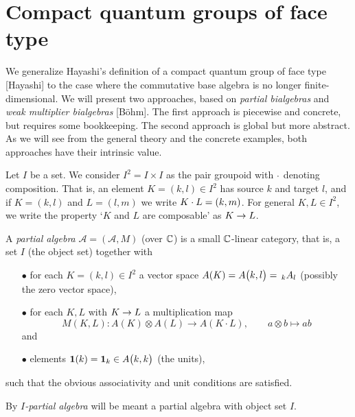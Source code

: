 \section{Compact quantum groups of face type}

We generalize Hayashi's definition of a compact quantum group of face type [Hayashi] to the case where the commutative base algebra is no longer finite-dimensional. We will present two approaches, based on \emph{partial bialgebras} and \emph{weak multiplier bialgebras} [B\"{o}hm]. The first approach is piecewise and concrete, but requires some bookkeeping. The second approach is global but more abstract. As we will see from the general theory and the concrete examples, both approaches have their intrinsic value.




Let $I$ be a set. We consider $I^2=I\times I$ as the pair groupoid with $\wmult$ denoting composition. That is, an element $K=(k,l)\in I^2$ has source $k$ and target $l$, and if $K=(k,l)$ and $L=(l,m)$ we write $K\wmult L = (k,m)$. For general $K,L\in I^2$, we write the property `$K$ and $L$ are composable' as $K\wmate L$. 

\begin{Def} A \emph{partial algebra} $\mathscr{A}=(\mathscr{A},M)$ (over $\C$) is a small $\C$-linear category, that is, a set $I$ (the object set) together with %
\begin{itemize}
\item[$\bullet$] for each $K=(k,l)\in I^2$ a vector space $A(K) = \Grs{A}{k}{l}=\!\!\GrDA{A}{k}{l}$ (possibly the zero vector space),
\item[$\bullet$] for each $K,L$ with $K\wmate L$ a multiplication map \[M(K,L):A(K) \otimes A(L)\rightarrow A(K\cdot L),\qquad a\otimes b \mapsto ab\]  and 
\item[$\bullet$] elements $\Unit(k) = \Unit_k \in \Grs{A}{k}{k}$ (the units), %
\end{itemize}
such that the obvious associativity and unit conditions are satisfied. 

By \emph{$I$-partial algebra} will be meant a partial algebra with object set $I$.
\end{Def}


